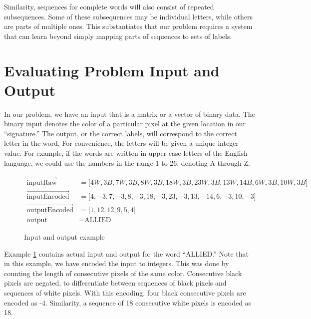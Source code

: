 Similarity, sequences for complete words will also consist of repeated subsequences. Some of these subsequences may be individual letters, while others are parts of multiple ones. This substantiates that our problem requires a system that can learn beyond simply mapping parts of sequences to sets of labels.


\section{Evaluating Problem Input and Output}
\label{sec:evaluating_problem_input_and_output}
In our problem, we have an input that is a matrix or a vector of binary data. The binary input denotes the color of a particular pixel at the given location in our ``signature.'' The output, or the correct labels, will correspond to the correct letter in the word. For convenience, the letters will be given a unique integer value. For example, if the words are written in upper-case letters of the English language, we could use the numbers in the range 1 to 26, denoting A through Z.

\begin{figure}[ht]
    \renewcommand\figurename{Example}
    \begin{equation*}
        \begin{aligned}
           \vec{\text{inputRaw}}               &= \lbrack 4W, 3B, 7W, 3B, 8W, 3B, 18W, 3B, 23W, 3B, 13W, 14B, 6W, 3B, 10W, 3B \rbrack \\
           \vec{\text{inputEncoded}}           &= \lbrack 4, -3, 7, -3, 8, -3, 18, -3, 23, -3, 13, -14, 6, -3, 10, -3 \rbrack \\
           \vec{\text{outputEncoded}}          &= \lbrack 1, 12, 12, 9, 5, 4 \rbrack \\
           \text{output}                       &= \text{ALLIED}
        \end{aligned}
    \end{equation*}
    \caption{Input and output example}
    \label{eq:input_output_example}
\end{figure}

Example \ref{eq:input_output_example} contains actual input and output for the word ``ALLIED.'' Note that in this example, we have encoded the input to integers. This was done by counting the length of consecutive pixels of the same color. Consecutive black pixels are negated, to differentiate between sequences of black pixels and sequences of white pixels. With this encoding, four black consecutive pixels are encoded as -4. Similarity, a sequence of 18 consecutive white pixels is encoded as 18.

